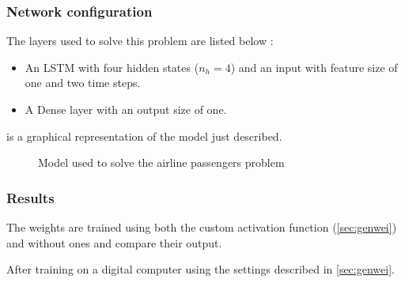 \subsubsection{Network configuration}

The layers used to solve this problem are listed below :

\begin{itemize}
  \item An \ac{LSTM} with four hidden states ($n_h=4$) and an input with feature size of one and two time steps.
  \item A Dense layer with an output size of one.
\end{itemize}

 is a graphical representation of the model just described.

\begin{figure}[H]
  \centering
  
  \caption{Model used to solve the airline passengers problem}
  \label{fig:airlineModel}
\end{figure}

\subsubsection{Results} %

The weights are trained using both the custom activation function (\cref{sec:genwei}) and without ones and compare their output.

After training on a digital computer using the settings described in \cref{sec:genwei}.
